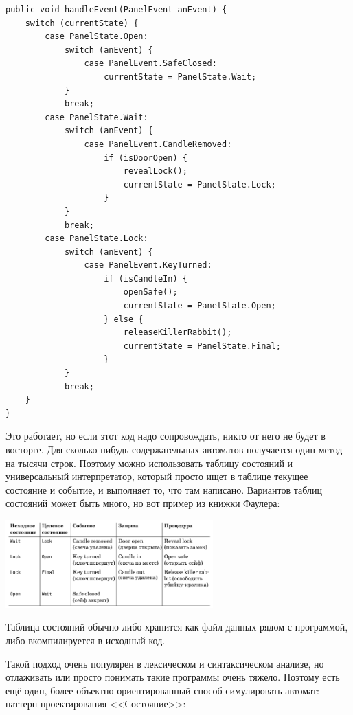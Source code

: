 \documentclass{../../text-style}
\begin{document}
\begin{verbatim}
public void handleEvent(PanelEvent anEvent) {
    switch (currentState) {
        case PanelState.Open:
            switch (anEvent) {
                case PanelEvent.SafeClosed:
                    currentState = PanelState.Wait;
            }
            break;
        case PanelState.Wait:
            switch (anEvent) {
                case PanelEvent.CandleRemoved:
                    if (isDoorOpen) {
                        revealLock();
                        currentState = PanelState.Lock;
                    }
            }
            break;
        case PanelState.Lock:
            switch (anEvent) {
                case PanelEvent.KeyTurned:
                    if (isCandleIn) {
                        openSafe();
                        currentState = PanelState.Open;
                    } else {
                        releaseKillerRabbit();
                        currentState = PanelState.Final;
                    }
            }
            break;
    }
}
\end{verbatim}

Это работает, но если этот код надо сопровождать, никто от него не будет в восторге. Для сколько-нибудь содержательных автоматов получается один метод на тысячи строк. Поэтому можно использовать таблицу состояний и универсальный интерпретатор, который просто ищет в таблице текущее состояние и событие, и выполняет то, что там написано. Вариантов таблиц состояний может быть много, но вот пример из книжки Фаулера:

\begin{center}
    \includegraphics[width=0.6\textwidth]{stateTransitionStateTable.png}
\end{center}

Таблица состояний обычно либо хранится как файл данных рядом с программой, либо вкомпилируется в исходный код. 

Такой подход очень популярен в лексическом и синтаксическом анализе, но отлаживать или просто понимать такие программы очень тяжело. Поэтому есть ещё один, более объектно-ориентированный способ симулировать автомат: паттерн проектирования <<Состояние>>:
\end{document}
